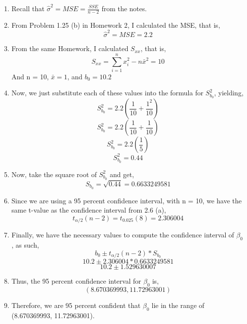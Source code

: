 \documentclass{article}
\begin{document}
\begin{enumerate}[label = \alph*)]
\begin{enumerate}[label = \arabic*)]
			\item Recall that $\hat{\sigma}^2 = MSE = \frac{SSE}{n-2}$ from the notes.
			\item From Problem 1.25 (b) in Homework 2, I calculated  the MSE, that is,
			\[\hat{\sigma}^2 = MSE = 2.2\]
			\item From the same Homework, I calculated $S_{xx}$, that is,
			\[S_{xx} = \sum_{i=1}^n x_i^2 - n\bar{x}^2 = 10\]
			And n = 10, $\bar{x} = 1$, and $b_0 = 10.2$
			\item Now, we just substitute each of these values into the formula for $S_{b_0}^2$, yielding,
			\[S_{b_0}^2 = 2.2(\frac{1}{10}+\frac{1^2}{10})\]
			\[S_{b_0}^2 = 2.2(\frac{1}{10}+\frac{1}{10})\]
			\[S_{b_0}^2 = 2.2(\frac{1}{5})\]
			\[S_{b_0}^2 = 0.44\]
			\item Now, take the square root of $S_{b_0}^2$ and get,
			\[S_{b_0} = \sqrt{0.44} = 0.6633249581\]
			\item Since we are using a 95 percent confidence interval, with n = 10, we have the same t-value as the confidence interval from 2.6 (a),
			\[t_{\alpha/2}(n-2) = t_{0.025}(8) = 2.306004\]
			\item Finally, we have the necessary values to compute the confidence interval of $\beta_0$, as such,
			\[b_0 \pm t_{\alpha/2}(n-2)*S_{b_0}\]
			\[10.2 \pm 2.306004*0.6633249581\]
			\[10.2 \pm 1.529630007\]
			\item Thus, the 95 percent confidence interval for $\beta_0$ is,
			\[(8.670369993, 11.72963001)\]
			\item Therefore, we are 95 percent confident that $\beta_0$ lie in the range of (8.670369993, 11.72963001).
		\end{enumerate}
	
	\end{enumerate}
\end{document}

